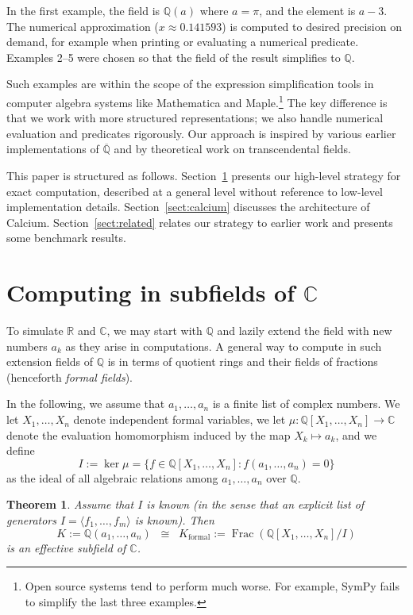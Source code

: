 \documentclass[sigconf,screen,urlbreakonhyphens]{acmart}
\newtheorem{theorem}{Theorem}
\begin{document}
In the first example, the field is $\mathbb{Q}(a)$ where $a = \pi$,
and the element is $a-3$.
The numerical approximation ($x \approx 0.141593$) is computed to
desired precision on demand, for example when printing
or evaluating a numerical predicate.
Examples 2--5 were chosen so that the field
of the result simplifies to $\mathbb{Q}$.

Such examples are within the scope of the
expression simplification tools in computer algebra systems like
Mathematica and Maple.\footnote{Open source systems
tend to perform much worse. For example, SymPy
fails to simplify the last three examples.}
The key difference is that we
work with more structured representations;
we also handle numerical evaluation and predicates rigorously.
Our approach is inspired by
various earlier implementations of $\overline{\mathbb{Q}}$
and by theoretical work on transcendental fields.

This paper is structured as follows. Section~\ref{sect:algebraic}
presents our high-level strategy for exact computation, described at a general level
without reference to low-level implementation details.
Section~\ref{sect:calcium} discusses the architecture of Calcium.
Section~\ref{sect:related} relates our strategy
to earlier work and presents some benchmark results.

\section{Computing in subfields of $\mathbb{C}$}

\label{sect:algebraic}

To simulate $\mathbb{R}$ and $\mathbb{C}$,
we may start with $\mathbb{Q}$ and
lazily extend the field with new numbers $a_k$ as they arise
in computations.
A general way to compute in such extension fields of $\mathbb{Q}$
is in terms of quotient rings
and their fields of fractions (henceforth \emph{formal fields}).

In the following, we assume that $a_1,\ldots,a_n$ is a finite list of complex numbers.
We let $X_1,\ldots,X_n$ denote independent formal variables,
we let $\mu : \mathbb{Q}[X_1,\ldots,X_n] \to \mathbb{C}$ denote
the evaluation homomorphism
induced by the map $X_k \mapsto a_k$,
and we define $$I := \ker \mu = \{ f \in \mathbb{Q}[X_1,\ldots,X_n]: f(a_1,\ldots,a_n) = 0\}$$
as the ideal of all algebraic relations among $a_1,\ldots,a_n$ over $\mathbb{Q}$.

\begin{theorem}
Assume that $I$ is known (in the sense
that an explicit list of generators $I = \langle f_1, \ldots, f_m \rangle$ is known). Then
$$K := \mathbb{Q}(a_1,\ldots,a_n) \;\; \cong \;\; K_{\text{formal}} := \operatorname{Frac}(\mathbb{Q}[X_1,\ldots,X_n] / I)$$
is an effective subfield of $\mathbb{C}$.
\label{thm:effective}
\end{theorem}
\end{document}
